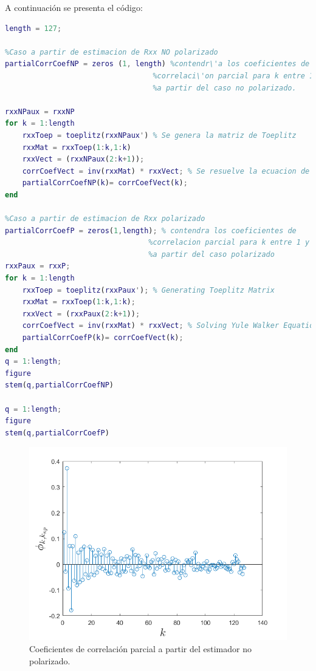 A continuaci\'on se presenta el c\'odigo:

\begin{lstlisting}[language=Matlab, caption=EJ1.m]
%% ITEM 2
length = 127;

%Caso a partir de estimacion de Rxx NO polarizado
partialCorrCoefNP = zeros (1, length) %contendr\'a los coeficientes de 
                                  %correlaci\'on parcial para k entre 1 y 127
                                  %a partir del caso no polarizado.

rxxNPaux = rxxNP                               
for k = 1:length
    rxxToep = toeplitz(rxxNPaux') % Se genera la matriz de Toeplitz
    rxxMat = rxxToep(1:k,1:k)
    rxxVect = (rxxNPaux(2:k+1));
    corrCoefVect = inv(rxxMat) * rxxVect; % Se resuelve la ecuacion de Yule Walker
    partialCorrCoefNP(k)= corrCoefVect(k);
end

%Caso a partir de estimacion de Rxx polarizado
partialCorrCoefP = zeros(1,length); % contendra los coeficientes de 
                                 %correlacion parcial para k entre 1 y 127; 
                                 %a partir del caso polarizado
rxxPaux = rxxP;                                
for k = 1:length
    rxxToep = toeplitz(rxxPaux'); % Generating Toeplitz Matrix
    rxxMat = rxxToep(1:k,1:k);
    rxxVect = (rxxPaux(2:k+1));
    corrCoefVect = inv(rxxMat) * rxxVect; % Solving Yule Walker Equation
    partialCorrCoefP(k)= corrCoefVect(k);
end
q = 1:length;
figure
stem(q,partialCorrCoefNP)

q = 1:length;
figure
stem(q,partialCorrCoefP)
\end{lstlisting}

\begin{figure}[H] %
\centering
\includegraphics[scale=0.45]{../EJ1/coefCorrParcialNP}
\caption{Coeficientes de correlaci\'on parcial a partir del estimador no polarizado.}
\label{fiNP}
\end{figure}

